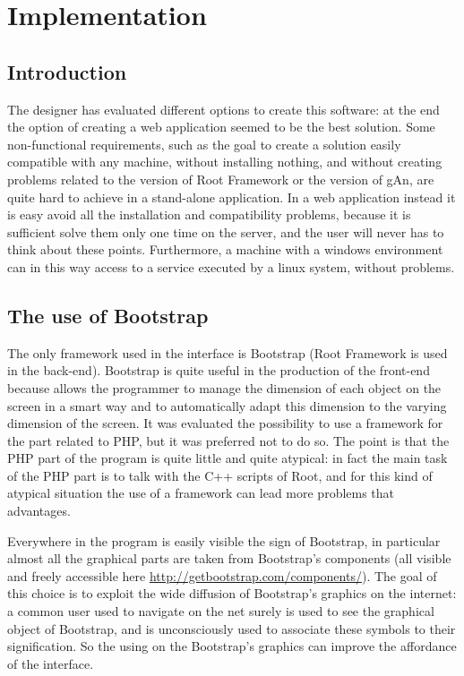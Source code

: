 
\chapter{Implementation} %

\label{Chapter8} %


\section{Introduction}

The designer has evaluated different options to create this software: at the end the option of creating a web application seemed to be the best solution.
Some non-functional requirements, such as the goal to create a solution easily compatible with any machine, without installing nothing, and without creating problems related to the version of Root Framework or the version of gAn, are quite hard to achieve in a stand-alone application. In a web application instead it is easy avoid all the installation and compatibility problems, because it is sufficient solve them only one time on the server, and the user will never has to think about these points. Furthermore, a machine with a windows environment can in this way access to a service executed by a linux system, without problems.  

\section{The use of Bootstrap}

The only framework used in the interface is Bootstrap (Root Framework is used in the back-end). Bootstrap is quite useful in the production of the front-end because allows the programmer to manage the dimension of each object on the screen in a smart way and to automatically adapt this dimension to the varying dimension of the screen. It was evaluated the possibility to use a framework for the part related to PHP, but it was preferred not to do so. The point is that the PHP part of the program is quite little and quite atypical: in fact the main task of the PHP part is to talk with the C++ scripts of Root, and for this kind of atypical situation the use of a framework can lead more problems that advantages.  

Everywhere in the program is easily visible the sign of Bootstrap, in particular almost all the graphical parts are taken from Bootstrap's components (all visible and freely accessible here \url{http://getbootstrap.com/components/}). The goal of this choice is to exploit the wide diffusion of Bootstrap's graphics on the internet: a common user used to navigate on the net surely is used to see the graphical object of Bootstrap, and is unconsciously used to associate these symbols to their signification. So the using on the Bootstrap's graphics can improve the affordance of the interface. 


